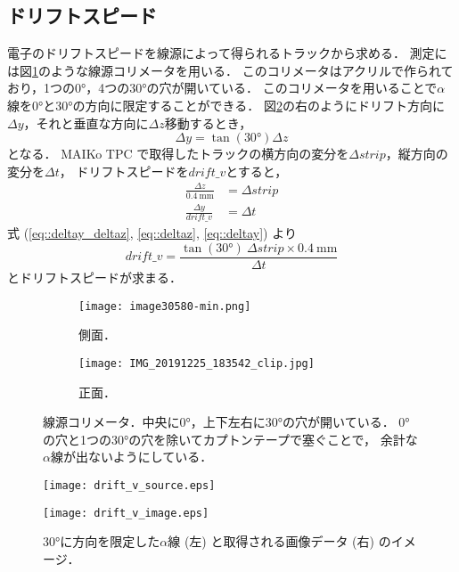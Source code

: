 \documentclass[../master]{subfiles}
\begin{document}
\subsection{ドリフトスピード}
電子のドリフトスピードを線源によって得られるトラックから求める．
測定には図\ref{pic::alpha_collimator}のような線源コリメータを用いる．
このコリメータはアクリルで作られており，1つの\ang{0}，4つの\ang{30}の穴が開いている．
このコリメータを用いることで$\alpha$線を\ang{0}と\ang{30}の方向に限定することができる．
図\ref{fig::drift_v_image}の右のようにドリフト方向に$\Delta y$，それと垂直な方向に$\Delta z$移動するとき，
\begin{equation}
  \Delta y = \tan(\ang{30})\Delta z \label{eq::deltay_deltaz}
\end{equation}
となる．
MAIKo TPC で取得したトラックの横方向の変分を$\Delta strip$，縦方向の変分を$\Delta t$，
ドリフトスピードを$drift\_v$とすると，
\begin{align}
  \frac{\Delta z}{\SI{0.4}{\milli\metre}} & = \Delta strip \label{eq::deltaz}\\
  \frac{\Delta y}{drift\_v} & = \Delta t \label{eq::deltay}
\end{align}
式 (\ref{eq::deltay_deltaz}, \ref{eq::deltaz}, \ref{eq::deltay}) より
\begin{equation}
  drift\_v = \frac{\tan(\ang{30})~\Delta strip\times\SI{0.4}{\milli\metre}}{\Delta t}
\end{equation}
とドリフトスピードが求まる．
\begin{figure}
  \centering
  \begin{subfigure}{0.45\columnwidth}
    \centering
    \texttt{[image: image30580-min.png]}
    \caption{側面．}
  \end{subfigure}
  \begin{subfigure}{0.45\columnwidth}
    \centering
    \texttt{[image: IMG\_20191225\_183542\_clip.jpg]}
    \caption{正面．}
  \end{subfigure}
  \caption[線源コリメータ．]
          {線源コリメータ．中央に\ang{0}，上下左右に\ang{30}の穴が開いている．
            \ang{0}の穴と1つの\ang{30}の穴を除いてカプトンテープで塞ぐことで，
            余計な$\alpha$線が出ないようにしている．
          }
          \label{pic::alpha_collimator}
\end{figure}
\begin{figure}
  \centering
  \begin{minipage}{0.45\columnwidth}
    \centering
    \texttt{[image: drift\_v\_source.eps]}
  \end{minipage}
  \begin{minipage}{0.45\columnwidth}
    \centering
    \texttt{[image: drift\_v\_image.eps]}
  \end{minipage}
  \caption[\ang{30}に方向を限定した$\alpha$線と取得される画像データのイメージ．]
          {\ang{30}に方向を限定した$\alpha$線 (左) と取得される画像データ (右) のイメージ．}
  \label{fig::drift_v_image}
\end{figure}
\end{document}
